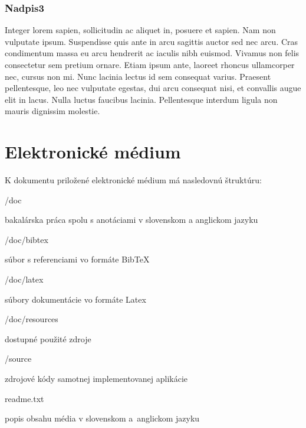\subsubsection{Nadpis3}
Integer lorem sapien, sollicitudin ac aliquet in, posuere et sapien. Nam non vulputate ipsum. Suspendisse quis ante in arcu sagittis auctor sed nec arcu. Cras condimentum massa eu arcu hendrerit ac iaculis nibh euismod. Vivamus non felis consectetur sem pretium ornare. Etiam ipsum ante, laoreet rhoncus ullamcorper nec, cursus non mi. Nunc lacinia lectus id sem consequat varius. Praesent pellentesque, leo nec vulputate egestas, dui arcu consequat nisi, et convallis augue elit in lacus. Nulla luctus faucibus lacinia. Pellentesque interdum ligula non mauris dignissim molestie.

\newpage
\section{Elektronické médium}

K dokumentu priložené elektronické médium má nasledovnú štruktúru:
\begin{my_itemize}

\emptyitem /doc
    \begin{my_itemize}
    \myitem bakalárska práca spolu s anotáciami v slovenskom a anglickom jazyku
    \end{my_itemize}

\emptyitem /doc/bibtex
    \begin{my_itemize}
    \myitem súbor s referenciami vo formáte BibTeX
    \end{my_itemize}

\emptyitem /doc/latex
    \begin{my_itemize}
    \myitem súbory dokumentácie vo formáte Latex
    \end{my_itemize}

\emptyitem /doc/resources
    \begin{my_itemize}
    \myitem dostupné použité zdroje
    \end{my_itemize}

\emptyitem /source
    \begin{my_itemize}
    \myitem zdrojové kódy samotnej implementovanej aplikácie
    \end{my_itemize}

\emptyitem readme.txt
    \begin{my_itemize}
    \myitem popis obsahu média v slovenskom a~anglickom jazyku
    \end{my_itemize}
\end{my_itemize}
